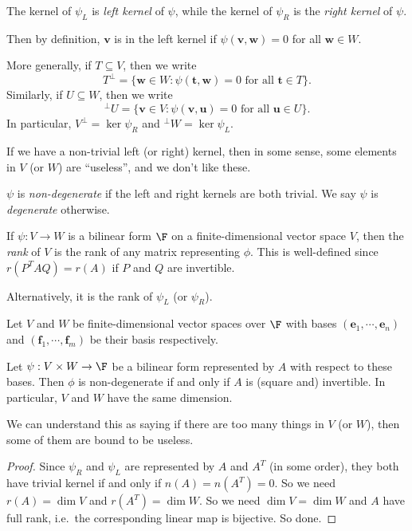 \documentclass[a4paper]{article}
\begin{document}
\begin{defi}
  The kernel of $\psi_L$ is \emph{left kernel} of $\psi$, while the kernel of $\psi_R$ is the \emph{right kernel} of $\psi$.
\end{defi}
Then by definition, $\mathbf{v}$ is in the left kernel if $\psi(\mathbf{v}, \mathbf{w}) = 0$ for all $\mathbf{w} \in W$.

More generally, if $T\subseteq V$, then we write
\[
  T^\bot = \{\mathbf{w} \in W: \psi(\mathbf{t}, \mathbf{w}) = 0\text{ for all }\mathbf{t} \in T\}.
\]
Similarly, if $U\subseteq W$, then we write
\[
  ^\bot U = \{\mathbf{v} \in V: \psi(\mathbf{v}, \mathbf{u}) = 0\text{ for all }\mathbf{u}\in U\}.
\]
In particular, $V^\bot = \ker \psi_R$ and $^\bot W = \ker \psi_L$.

If we have a non-trivial left (or right) kernel, then in some sense, some elements in $V$ (or $W$) are ``useless'', and we don't like these.
\begin{defi}
  $\psi$ is \emph{non-degenerate} if the left and right kernels are both trivial. We say $\psi$ is \emph{degenerate} otherwise.
\end{defi}

\begin{defi}
  If $\psi: V\to W$ is a bilinear form $\F$ on a finite-dimensional vector space $V$, then the \emph{rank} of $V$ is the rank of any matrix representing $\phi$. This is well-defined since $r(P^T AQ) = r(A)$ if $P$ and $Q$ are invertible.

  Alternatively, it is the rank of $\psi_L$ (or $\psi_R$).
\end{defi}

\begin{lemma}
  Let $V$ and $W$ be finite-dimensional vector spaces over $\F$ with bases $(\mathbf{e}_1, \cdots, \mathbf{e}_n)$ and $(\mathbf{f}_1, \cdots, \mathbf{f}_m)$ be their basis respectively.

  Let $\psi: V\times W \to \F$ be a bilinear form represented by $A$ with respect to these bases. Then $\phi$ is non-degenerate if and only if $A$ is (square and) invertible. In particular, $V$ and $W$ have the same dimension.
\end{lemma}
We can understand this as saying if there are too many things in $V$ (or $W$), then some of them are bound to be useless.

\begin{proof}
  Since $\psi_R$ and $\psi_L$ are represented by $A$ and $A^T$ (in some order), they both have trivial kernel if and only if $n(A) = n(A^T) = 0$. So we need $r(A) = \dim V$ and $r(A^T) = \dim W$. So we need $\dim V = \dim W$ and $A$ have full rank, i.e.\ the corresponding linear map is bijective. So done.
\end{proof}
\end{document}
